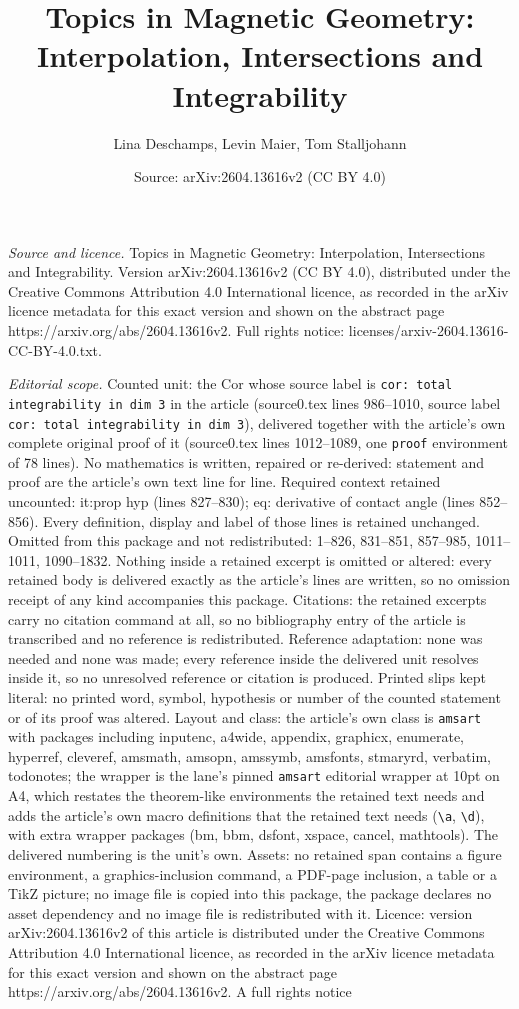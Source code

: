 \documentclass[10pt,a4paper]{amsart}
\title[Topics in Magnetic Geometry: Interpolation, Intersections an]{Topics in Magnetic Geometry: Interpolation, Intersections and Integrability}
\author{Lina Deschamps, Levin Maier, Tom Stalljohann}
\date{Source: arXiv:2604.13616v2 (CC BY 4.0)}
\begin{document}
\maketitle

\noindent\emph{Source and licence.} Topics in Magnetic Geometry: Interpolation, Intersections and Integrability. Version arXiv:2604.13616v2 (CC BY 4.0), distributed under the Creative Commons Attribution 4.0 International licence, as recorded in the arXiv licence metadata for this exact version and shown on the abstract page https://arxiv.org/abs/2604.13616v2. Full rights notice: licenses/arxiv-2604.13616-CC-BY-4.0.txt.\par\smallskip

\noindent\textit{Editorial scope.} Counted unit: the Cor whose source label is \texttt{cor: total integrability in dim 3} in the article (source0.tex lines 986--1010, source label \texttt{cor: total integrability in dim 3}), delivered together with the article's own complete original proof of it (source0.tex lines 1012--1089, one \texttt{proof} environment of 78 lines). No mathematics is written, repaired or re-derived: statement and proof are the article's own text line for line. Required context retained uncounted: it:prop hyp (lines 827--830); eq: derivative of contact angle (lines 852--856). Every definition, display and label of those lines is retained unchanged. Omitted from this package and not redistributed: 1--826, 831--851, 857--985, 1011--1011, 1090--1832. Nothing inside a retained excerpt is omitted or altered: every retained body is delivered exactly as the article's lines are written, so no omission receipt of any kind accompanies this package. Citations: the retained excerpts carry no citation command at all, so no bibliography entry of the article is transcribed and no reference is redistributed. Reference adaptation: none was needed and none was made; every reference inside the delivered unit resolves inside it, so no unresolved reference or citation is produced. Printed slips kept literal: no printed word, symbol, hypothesis or number of the counted statement or of its proof was altered. Layout and class: the article's own class is \texttt{amsart} with packages including inputenc, a4wide, appendix, graphicx, enumerate, hyperref, cleveref, amsmath, amsopn, amssymb, amsfonts, stmaryrd, verbatim, todonotes; the wrapper is the lane's pinned \texttt{amsart} editorial wrapper at 10pt on A4, which restates the theorem-like environments the retained text needs and adds the article's own macro definitions that the retained text needs (\texttt{\textbackslash a}, \texttt{\textbackslash d}), with extra wrapper packages (bm, bbm, dsfont, xspace, cancel, mathtools). The delivered numbering is the unit's own. Assets: no retained span contains a figure environment, a graphics-inclusion command, a PDF-page inclusion, a table or a TikZ picture; no image file is copied into this package, the package declares no asset dependency and no image file is redistributed with it. Licence: version arXiv:2604.13616v2 of this article is distributed under the Creative Commons Attribution 4.0 International licence, as recorded in the arXiv licence metadata for this exact version and shown on the abstract page https://arxiv.org/abs/2604.13616v2. A full rights notice 
\end{document}
